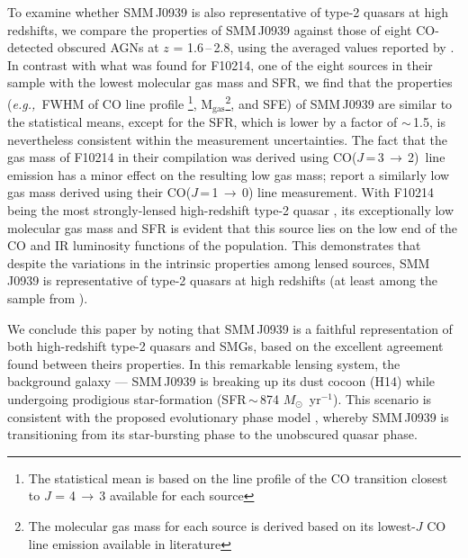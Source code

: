 \documentclass[twocolumn,apj,numberedappendix]{emulateapj}
\newcommand{\Msun}{\mbox{$M_{\odot}$}}
\newcommand{\rarr}{$\rightarrow$}
\newcommand{\CO}{\mbox{CO($J$\,=\,3\,$\rightarrow$\,2) }}
\newcommand{\eg}{{\sl e.g.,~}}
\newcommand{\pmOne}{\mbox{$^{-1}$}}
\begin{document}
To examine whether SMM\,J0939 is also representative of type-2 quasars at high redshifts, we compare the properties of SMM\,J0939
against those of eight CO-detected obscured AGNs at $z$ = 1.6\,--\,2.8, using the averaged values reported by \citet[][and references
therein]{Polletta11a}. %
In contrast with what was found for F10214, one of the eight sources in their sample with the lowest molecular gas mass and SFR, we find that the properties
(\eg FWHM of CO line profile \footnote{The statistical mean is based on the line profile of the CO transition closest to $J$ = 4\,\rarr\,3 available for each source}, M$_\textrm{gas}$\footnote{The molecular gas mass for each source is derived based on its lowest-$J$ CO line emission available in literature}, and SFE) of SMM\,J0939 are similar to the statistical means, except for the SFR, which is lower by a
factor of $\sim$\,1.5, is nevertheless consistent within the measurement uncertainties. The fact that the gas mass of F10214 in their compilation was derived using \CO line emission \citep{Solomon05a} has a minor effect on the resulting low gas mass; \citet{Riechers11a} report a similarly low gas mass derived using their CO($J$\,=\,1\,\rarr\,0) line measurement. 
With F10214 being the most strongly-lensed high-redshift type-2 quasar \citep[$\mu_{\textrm L}$ = 17; ][]{Solomon05a}, its exceptionally low molecular gas mass and SFR is evident that this source lies on the low end of the CO and IR luminosity functions of the population.
This demonstrates that despite the variations in the intrinsic properties among lensed sources,
 SMM\,J0939 is representative of type-2 quasars at high redshifts (at least among the sample from \citealt{Polletta11a}).

We conclude this paper by noting that SMM\,J0939 is a faithful representation of both high-redshift type-2 quasars and SMGs,
based on the excellent agreement found between theirs properties. In this remarkable lensing system, the background galaxy --- SMM\,J0939 is
breaking up its dust cocoon (H14) while undergoing prodigious star-formation (SFR\,$\sim$\,874 \Msun~yr\pmOne).
This scenario is consistent with the proposed evolutionary phase model \citep{Sanders88,Coppin08a,Simpson12a}, whereby SMM\,J0939 is transitioning from its star-bursting phase to the unobscured quasar phase.
\end{document}
